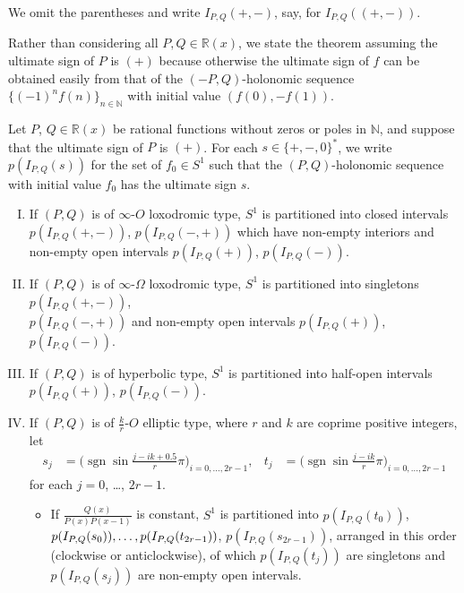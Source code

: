 \documentclass[a4paper,UKenglish,cleveref,autoref,thm-restate]{lipics-v2021}
\newcommand{\R}{\mathbb{R}}
\newcommand{\N}{\mathbb{N}}
\DeclareMathOperator{\sgn}{sgn}
\begin{document}
We omit the parentheses and write $I_{P, Q}(+, -)$, say, for $I_{P, Q}((+, -))$. 

Rather than considering all $P, Q \in \R(x)$, 
we state the theorem assuming the ultimate sign of $P$ is $(+)$ because otherwise the ultimate sign of $f$ can be obtained easily from that of 
the $(-P, Q)$-holonomic sequence $\{ (-1)^n f(n) \}_{n \in \N}$ with initial value $(f (0), -f (1))$. 

\begin{theorem}\label{thm:main}
Let $P$, $Q \in \R(x)$ be rational functions without zeros or poles in $\N$, 
and suppose that the ultimate sign of $P$ is $(+)$. 
For each $s \in \{ +, -, 0 \}^*$, 
we write $p (I_{P, Q} (s))$ for the set of $f_0 \in S ^1$ such that 
the $(P, Q)$-holonomic sequence with initial value $f _0$ 
has the ultimate sign $s$.
\begin{enumerate}[(I)]
\item \label{item:loxodromic_nearly_infty}
If $(P, Q)$ is of $\infty$-$O$ loxodromic type, $S ^1$ is partitioned into
closed intervals \\
$p(I_{P, Q}(+, -))$, $p(I_{P, Q}(-, +))$ which have non-empty interiors and
non-empty open intervals $p(I_{P, Q}(+))$, $p(I_{P, Q}(-))$. 
\item \label{item:loxodromic_far_from_infty}
If $(P, Q)$ is of $\infty$-$\Omega$ loxodromic type, $S ^1$ is partitioned into
singletons $p(I_{P, Q}(+, -))$,
\\
$p(I_{P, Q}(-, +))$ and 
non-empty open intervals $p(I_{P, Q}(+))$, $p(I_{P, Q}(-))$. 
\item \label{item:hyperbolic}
If $(P, Q)$ is of hyperbolic type, $S ^1$ is partitioned into
half-open intervals $p(I_{P, Q}(+))$, $p(I_{P, Q}(-))$. 
\item \label{item:k/r-O_elliptic}
If $(P, Q)$ is of $\frac{k}r$-$O$ elliptic type, 
where $r$ and $k$ are coprime positive integers, 
let 
\begin{align*}
s_{j} & = \biggl( \sgn \sin \frac{j - ik + 0.5}r \pi \biggr)_{i=0, \dots, 2r-1}, &
t_{j} & = \biggl( \sgn \sin \frac{j - ik}r \pi \biggr)_{i=0, \dots, 2r-1}
\end{align*}
for each $j = 0$, \ldots, $2r-1$. 
\begin{itemize}
\item
If $\frac{Q(x)}{P(x)P(x-1)}$ is constant, 
$S ^1$ is partitioned into
$p(I_{P, Q}(t_0))$, $p(I_{P, Q}(s_0)), \dots, \break p(I_{P, Q}(t_{2r-1}))$, $p(I_{P, Q}(s_{2r-1}))$, 
arranged in this order (clockwise or anticlockwise), 
of which $p(I_{P, Q}(t_{j}))$ are singletons and $p(I_{P, Q}(s_{j}))$ are non-empty open intervals.

\end{itemize}
\end{enumerate}
\end{theorem}
\end{document}
